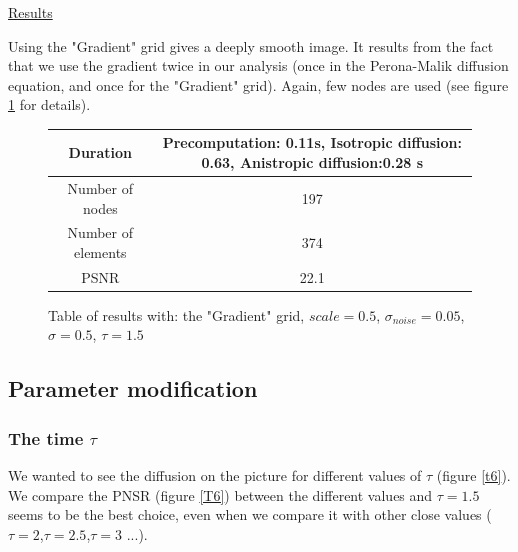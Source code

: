 \documentclass{report}
\begin{document}
\underline{Results}

Using the "Gradient" grid gives a deeply smooth image. It results from the fact that we use the gradient twice in our analysis (once in the Perona-Malik diffusion equation, and once for the "Gradient" grid). Again, few nodes are used (see figure \ref{T5} for details). 









        \begin{figure}[h!]
        \centering
        \caption{Table of results with: the "Gradient" grid, $scale=0.5$, $\sigma_{noise}=0.05$,$\sigma=0.5$, $\tau=1.5$}
        \label{T5}
        \begin{tabular}{|c|c|}
          \hline
         Duration &  Precomputation: 0.11s,
         Isotropic diffusion: 0.63,
         Anistropic diffusion:0.28 s   \\
        \hline
         Number of nodes & 197 \\
         \hline
         Number of elements & 374\\
 
         \hline
         PSNR & 22.1 \\
         \hline
        \end{tabular}
        \end{figure}






\subsection{Parameter modification}
\subsubsection{The time $\tau$}


We wanted to see the diffusion on the picture for different values of $\tau$ (figure \ref{t6}). We compare the PNSR (figure \ref{T6}) between the different values and $\tau=1.5$ seems to be the best choice, even when we compare it with other close values ($\tau=2$,$\tau=2.5$,$\tau=3$ ...). \\ 







\end{document}
